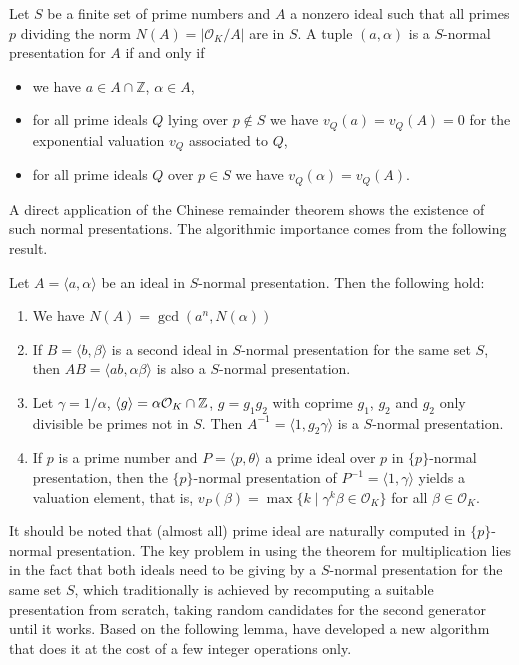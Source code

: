 \documentclass{sig-alternate-05-2015}
\begin{document}
\begin{definition}
Let $S$ be a finite set of prime numbers and $A$ a nonzero ideal such that
all primes $p$ dividing the norm $N(A) = |\mathcal O_K/A|$ are in $S$.
A tuple $(a, \alpha)$ is a $S$-normal presentation for $A$ if and only if
\begin{itemize}
\item we have $a\in A\cap \mathbb Z$, $\alpha\in A$,
\item for all prime ideals $Q$ lying over $p\not\in S$ we have $v_Q(a)= v_Q(A) = 0$
  for the exponential valuation $v_Q$ associated to $Q$,
\item for all prime ideals $Q$ over $p\in S$ we have $v_Q(\alpha) = v_Q(A)$.
\end{itemize}
\end{definition}

A direct application of the Chinese remainder theorem shows the existence of such normal presentations.
The algorithmic importance comes from the following result.

\begin{theorem}
Let $A = \langle a, \alpha \rangle$ be an ideal in $S$-normal presentation. Then the following hold:
\begin{enumerate}
\item We have $N(A) = \gcd(a^n, N(\alpha))$
\item If $B = \langle b, \beta\rangle$ is a second ideal in $S$-normal
presentation for the same set $S$, then
$AB = \langle ab, \alpha\beta\rangle$ is also a $S$-normal presentation.
\item Let $\gamma = 1/\alpha$, $\langle g\rangle = \alpha \mathcal O_K \cap \mathbb{Z}$,
 $g = g_1g_2$ with coprime $g_1$, $g_2$ and $g_2$ only divisible be primes not in $S$. Then $A^{-1} = \langle 1, g_2\gamma\rangle$ is a $S$-normal presentation.
\item If $p$ is a prime number and $P= \langle p, \theta\rangle$ a prime ideal over $p$
in $\{p\}$-normal presentation, then the $\{p\}$-normal presentation
of $P^{-1} = \langle 1, \gamma\rangle$ yields a valuation element, that is,
$v_P(\beta) = \max\{ k \mid \gamma^k\beta\in \mathcal O_K\}$ for all $\beta \in \mathcal O_K$.
\end{enumerate}
\end{theorem}

It should be noted that (almost all) prime ideal are naturally computed
in $\{p\}$-normal presentation. The key problem in using the theorem for
multiplication lies in the fact that both ideals need to be giving by a $S$-normal presentation for
the same set $S$, which traditionally is achieved by recomputing
a suitable presentation from scratch, taking random candidates for the
second generator until it works. Based on the following lemma, have developed a new algorithm that does it at the cost 
of a few integer operations only.
\end{document}
